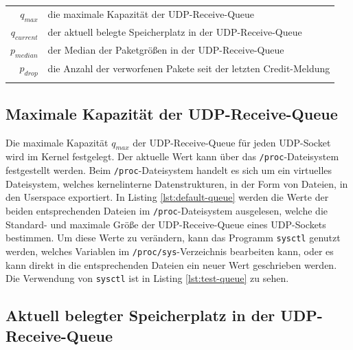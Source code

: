\documentclass[a4paper, 12pt, BCOR10mm, DIV12, toc=bibliography, toc=listof, german]{scrbook}
\begin{document}
		\begin{tabular}{rl}
			$q_{max}$		  & die maximale Kapazität der UDP-Receive-Queue\\
			$q_{current}$ &	der aktuell belegte Speicherplatz in der UDP-Receive-Queue\\
			$p_{median}$  &	der Median der Paketgrößen in der UDP-Receive-Queue\\
			$p_{drop}$    &	die Anzahl der verworfenen Pakete seit der letzten Credit-Meldung\\
										& \\
		\end{tabular}

		\subsection*{Maximale Kapazität der UDP-Receive-Queue} %

		
		

		Die maximale Kapazität $q_{max}$ der UDP-Receive-Queue für jeden UDP-Socket wird im Kernel festgelegt. Der
		aktuelle Wert kann über das \texttt{/proc}-Dateisystem festgestellt werden. Beim
		\texttt{/proc}-Dateisystem \cite{benvenuti2005} handelt es sich um ein virtuelles Dateisystem,
		welches kernelinterne Datenstrukturen, in der Form von Dateien, in den Userspace exportiert. In
		Listing \ref{lst:default-queue} werden die Werte der beiden entsprechenden Dateien im
		\texttt{/proc}-Dateisystem ausgelesen, welche die Standard- und maximale Größe der
		UDP-Receive-Queue eines UDP-Sockets bestimmen. Um diese Werte zu verändern, kann das Programm
		\texttt{sysctl} genutzt werden, welches Variablen im \texttt{/proc/sys}-Verzeichnis bearbeiten
		kann, oder es kann direkt in die entsprechenden Dateien ein neuer Wert geschrieben werden. Die
		Verwendung von \texttt{sysctl} ist in Listing \ref{lst:test-queue} zu sehen.


		\subsection*{Aktuell belegter Speicherplatz in der UDP-Receive-Queue} %
\end{document}
